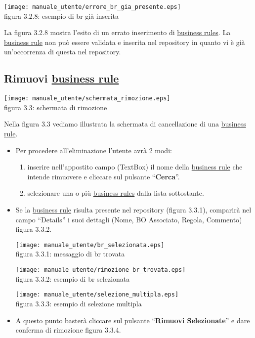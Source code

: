 \begin{center}
\texttt{[image: manuale\_utente/errore\_br\_gia\_presente.eps]}\\
 figura 3.2.8: esempio di br gi\`a inserita
\end{center} 
La figura 3.2.8 mostra l'esito di un errato inserimento di \underline{business rules}. La \underline{business rule} non pu\`o essere validata e inserita nel repository in quanto vi \`e gi\`a un'occorrenza di questa nel repository.

\subsection{Rimuovi \underline{business rule}}
\begin{center}
\texttt{[image: manuale\_utente/schermata\_rimozione.eps]}\\
 figura 3.3: schermata di rimozione
\end{center}
Nella figura 3.3 vediamo illustrata la schermata di cancellazione di una \underline{business rule}.
\begin{itemize}
\item Per procedere all'eliminazione l'utente avr\`a 2 modi:
\begin{enumerate}
\item inserire nell'appostito campo (TextBox) il nome della \underline{business rule} che intende rimuovere e cliccare sul pulsante ``\textbf{Cerca}''.
\item selezionare una o pi\`u \underline{business rules} dalla lista sottostante.
\end{enumerate}

\item Se la \underline{business rule} risulta presente nel repository (figura 3.3.1), comparir\`a  nel campo ``Details'' i suoi dettagli (Nome, BO Associato, Regola, Commento) figura 3.3.2. 

\begin{center}
\texttt{[image: manuale\_utente/br\_selezionata.eps]}\\
 figura 3.3.1: messaggio di br trovata
\end{center} 

\begin{center}
\texttt{[image: manuale\_utente/rimozione\_br\_trovata.eps]}\\
 figura 3.3.2: esempio di br selezionata
\end{center} 

\begin{center}
\texttt{[image: manuale\_utente/selezione\_multipla.eps]}\\
 figura 3.3.3: esempio di selezione multipla
\end{center} 

\item A questo punto baster\`a cliccare sul pulsante ``\textbf{Rimuovi Selezionate}'' e dare conferma di rimozione figura 3.3.4.  
\end{itemize}

